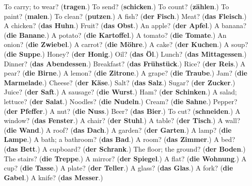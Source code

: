 \begin{tcolorbox}[breakable,colback=teal!4,colframe=teal!35!black,title={Before you move on}]
To carry; to wear? (\textbf{tragen}.) To send? (\textbf{schicken}.) To count? (\textbf{zählen}.) To paint? (\textbf{malen}.) To clean? (\textbf{putzen}.) A fish? (\textbf{der Fisch}.) Meat? (\textbf{das Fleisch}.) A chicken? (\textbf{das Huhn}.) Fruit? (\textbf{das Obst}.) An apple? (\textbf{der Apfel}.) A banana? (\textbf{die Banane}.) A potato? (\textbf{die Kartoffel}.) A tomato? (\textbf{die Tomate}.) An onion? (\textbf{die Zwiebel}.) A carrot? (\textbf{die Möhre}.) A cake? (\textbf{der Kuchen}.) A soup? (\textbf{die Suppe}.) Honey? (\textbf{der Honig}.) Oil? (\textbf{das Öl}.) Lunch? (\textbf{das Mittagessen}.) Dinner? (\textbf{das Abendessen}.) Breakfast? (\textbf{das Frühstück}.) Rice? (\textbf{der Reis}.) A pear? (\textbf{die Birne}.) A lemon? (\textbf{die Zitrone}.) A grape? (\textbf{die Traube}.) Jam? (\textbf{die Marmelade}.) Cheese? (\textbf{der Käse}.) Salt? (\textbf{das Salz}.) Sugar? (\textbf{der Zucker}.) Juice? (\textbf{der Saft}.) A sausage? (\textbf{die Wurst}.) Ham? (\textbf{der Schinken}.) A salad; lettuce? (\textbf{der Salat}.) Noodles? (\textbf{die Nudeln}.) Cream? (\textbf{die Sahne}.) Pepper? (\textbf{der Pfeffer}.) A nut? (\textbf{die Nuss}.) Beer? (\textbf{das Bier}.) To cut? (\textbf{schneiden}.) A window? (\textbf{das Fenster}.) A chair? (\textbf{der Stuhl}.) A table? (\textbf{der Tisch}.) A wall? (\textbf{die Wand}.) A roof? (\textbf{das Dach}.) A garden? (\textbf{der Garten}.) A lamp? (\textbf{die Lampe}.) A bath; a bathroom? (\textbf{das Bad}.) A room? (\textbf{das Zimmer}.) A bed? (\textbf{das Bett}.) A cupboard? (\textbf{der Schrank}.) The floor; the ground? (\textbf{der Boden}.) The stairs? (\textbf{die Treppe}.) A mirror? (\textbf{der Spiegel}.) A flat? (\textbf{die Wohnung}.) A cup? (\textbf{die Tasse}.) A plate? (\textbf{der Teller}.) A glass? (\textbf{das Glas}.) A fork? (\textbf{die Gabel}.) A knife? (\textbf{das Messer}.)
\end{tcolorbox}
